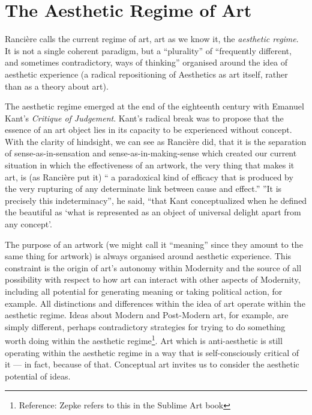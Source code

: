 \documentclass[letterpaper]{article}
\begin{document}
\section{The Aesthetic Regime of Art}

    Rancière calls the current regime of art, art as we know it, the \emph{aesthetic regime}.  It is not a single coherent paradigm, but a “plurality” of “frequently different, and sometimes contradictory, ways of thinking” \citep[p.8]{RanciereMdrnTms2022} organised around the idea of aesthetic experience (a radical repositioning of Aesthetics as art itself, rather than as a theory about art).
    
    The aesthetic regime emerged at the end of the eighteenth century with Emanuel Kant's \emph{Critique of Judgement}. Kant's radical break was to propose that the essence of an art object lies in its capacity to be experienced without concept. With the clarity of hindsight, we can see as Rancière did, that it is the separation of sense-as-in-sensation and sense-as-in-making-sense which created our current situation in which the effectiveness of an artwork, the very thing that makes it art, is (as Rancière put it) “ a paradoxical kind of efficacy that is produced by the very rupturing of any determinate link between cause and effect.” \citep[p.51]{RancierThEmncptdSpcttr2009} ”It is precisely this indeterminacy”, he said, “that Kant conceptualized when he defined the beautiful as ‘what is represented as an object of universal delight apart from any concept’. \citep[p.52]{RancierThEmncptdSpcttr2009}

    The purpose of an artwork (we might call it “meaning” since they amount to the same thing for artwork) is always organised around aesthetic experience. This constraint is the origin of art's autonomy within Modernity and the source of all possibility with respect to how art can interact with other aspects of Modernity, including all potential for generating meaning or taking political action, for example. All distinctions and differences within the idea of art operate within the aesthetic regime. Ideas about Modern and Post-Modern art, for example, are simply different, perhaps contradictory strategies for trying to do something worth doing within the aesthetic regime\footnote{Reference: Zepke refers to this in the Sublime Art book}. Art which is anti-aesthetic is still operating within the aesthetic regime in a way that is self-consciously critical of it — in fact, because of that. Conceptual art invites us to consider the aesthetic potential of ideas.
\end{document}
